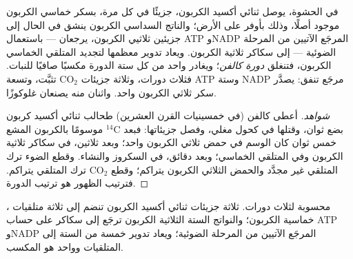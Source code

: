 \begin{proposition}\label{prop:g12:photosynthesis:calvin}
في الحشوة، يوصل ثنائي أكسيد الكربون، جزيئًا في كل مرة، بسكر خماسي
الكربون موجود أصلًا، وذلك بأوفر  على الأرض؛ والناتج السداسي
الكربون ينشق في الحال إلى جزيئين ثلاثيي الكربون، يرجعان --- باستعمال
ATP وNADP المرجَع الآتيين من المرحلة الضوئية --- إلى سكاكر ثلاثية
الكربون. ويعاد تدوير معظمها لتجديد المتلقي الخماسي الكربون، فتنغلق
\emph{دورة كالفن}؛ ويغادر واحد من كل ستة الدورة
مكسبًا صافيًا للنبات. فثلاث دورات، وثلاثة جزيئات $\mathrm{CO_2}$
تثبَّت، وتسعة ATP وستة NADP مرجَع تنفق: يصدَّر سكر ثلاثي الكربون واحد.
واثنان منه يصنعان غلوكوزًا.
\end{proposition}
\begin{proof}[شواهد]
أعطى كالفن (في خمسينيات القرن العشرين) طحالب ثنائي أكسيد كربون موسومًا
بالكربون المشع $^{14}$C بضع ثوان، وقتلها في كحول مغلي، وفصل جزيئاتها:
فبعد خمس ثوان كان الوسم في حمض ثلاثي الكربون واحد؛ وبعد ثلاثين، في
سكاكر ثلاثية الكربون وفي المتلقي الخماسي؛ وبعد دقائق، في السكروز
والنشاء. وقطع الضوء ترك المتلقي غير مجدَّد والحمض الثلاثي الكربون
يتراكم؛ وقطع $\mathrm{CO_2}$ ترك المتلقي يتراكم. فترتيب الظهور هو
ترتيب الدورة.
\end{proof}

\begin{omfigure}

{\small {}، محسوبة لثلاث دورات. ثلاثة جزيئات ثنائي أكسيد
الكربون تنضم إلى ثلاثة متلقيات خماسية الكربون؛ والنواتج الستة الثلاثية
الكربون ترجَع إلى سكاكر على حساب ATP وNADP المرجَع الآتيين من المرحلة
الضوئية؛ ويعاد تدوير خمسة من الستة إلى المتلقيات وواحد هو المكسب.}
\end{omfigure}

